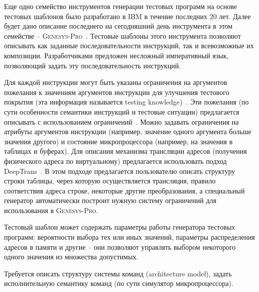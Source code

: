 Еще одно семейство инструментов генерации тестовых программ на
основе тестовых шаблонов было разработано в IBM в течение последних
20 лет. Далее будет дано описание последнего на сегодняшний день
инструмента в этом семействе --
\textsc{Genesys-Pro}~\cite{GenesysPro2004}. Тестовые шаблоны этого
инструмента позволяют описывать как заданные последовательности
инструкций, так и всевозможные их композиции. Разработчиками
предложен несложный императивный язык, позволяющий задать эту
последовательность инструкций.

Для каждой инструкции могут быть указаны ограничения на аргументов
пожелания к значениям аргументов инструкции для улучшения тестового
покрытия (эта информация называется testing
knowledge)~\cite{GenesysTK}. Эти пожелания (по сути особенности
семантики инструкций и тестовые ситуации) предлагается описывать с
использованием ограничений~\cite{GenesysPro2004Innovations}. Можно
задавать ограничения на атрибуты аргументов инструкции (например,
значение одного аргумента больше значения другого) и состояние
микропроцессора (например, на значения в таблицах и буферах). Для
описания механизма трансляции адресов (получения физического адреса
по виртуальному) предлагается использовать подход
DeepTrans~\cite{DeepTrans}. В этом подходе предлагается пользователю
описать структуру строки таблицы, через которую осуществляется
трансляция, правило соответствия адреса строке, некоторые другие
преобразования, а специальный генератор автоматически построит
нужную систему ограничений для использования в \textsc{Genesys-Pro}.

Тестовый шаблон может содержать параметры работы генератора тестовых
программ: вероятности выбора тех или иных значений, параметры
распределения адресов в памяти и другие -- они позволяют управлять
выбором некоторого одного значения из множества допустимых.

Требуется описать структуру системы команд (architecture model),
задать исполнительную семантику команд (по сути симулятор
микропроцессора).

